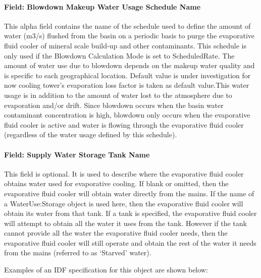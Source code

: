 \paragraph{Field: Blowdown Makeup Water Usage Schedule Name}\label{field-blowdown-makeup-water-usage-schedule-name-5}

This alpha field contains the name of the schedule used to define the amount of water (m3/s) flushed from the basin on a periodic basis to purge the evaporative fluid cooler of mineral scale build-up and other contaminants. This schedule is only used if the Blowdown Calculation Mode is set to ScheduledRate. The amount of water use due to blowdown depends on the makeup water quality and is specific to each geographical location. Default value is under investigation for now cooling tower's evaporation loss factor is taken as default value.This water usage is in addition to the amount of water lost to the atmosphere due to evaporation and/or drift. Since blowdown occurs when the basin water contaminant concentration is high, blowdown only occurs when the evaporative fluid cooler is active and water is flowing through the evaporative fluid cooler (regardless of the water usage defined by this schedule).

\paragraph{Field: Supply Water Storage Tank Name}\label{field-supply-water-storage-tank-name-5}

This field is optional. It is used to describe where the evaporative fluid cooler obtains water used for evaporative cooling. If blank or omitted, then the evaporative fluid cooler will obtain water directly from the mains. If the name of a WaterUse:Storage object is used here, then the evaporative fluid cooler will obtain its water from that tank. If a tank is specified, the evaporative fluid cooler will attempt to obtain all the water it uses from the tank. However if the tank cannot provide all the water the evaporative fluid cooler needs, then the evaporative fluid cooler will still operate and obtain the rest of the water it needs from the mains (referred to as `Starved' water).

Examples of an IDF specification for this object are shown below:

